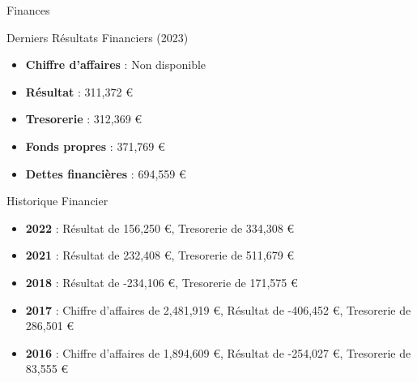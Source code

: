 \begin{frame}{Finances}
\label{finances}
\begin{block}{Derniers Résultats Financiers (2023)}
\label{derniers-ruxe9sultats-financiers-2023}
\begin{itemize}
\tightlist
\item
  \textbf{Chiffre d'affaires} : Non disponible
\item
  \textbf{Résultat} : 311,372 €
\item
  \textbf{Tresorerie} : 312,369 €
\item
  \textbf{Fonds propres} : 371,769 €
\item
  \textbf{Dettes financières} : 694,559 €
\end{itemize}
\end{block}

\begin{block}{Historique Financier}
\label{historique-financier}
\begin{itemize}
\tightlist
\item
  \textbf{2022} : Résultat de 156,250 €, Tresorerie de 334,308 €
\item
  \textbf{2021} : Résultat de 232,408 €, Tresorerie de 511,679 €
\item
  \textbf{2018} : Résultat de -234,106 €, Tresorerie de 171,575 €
\item
  \textbf{2017} : Chiffre d'affaires de 2,481,919 €, Résultat de
  -406,452 €, Tresorerie de 286,501 €
\item
  \textbf{2016} : Chiffre d'affaires de 1,894,609 €, Résultat de
  -254,027 €, Tresorerie de 83,555 €
\end{itemize}
\end{block}
\end{frame}

